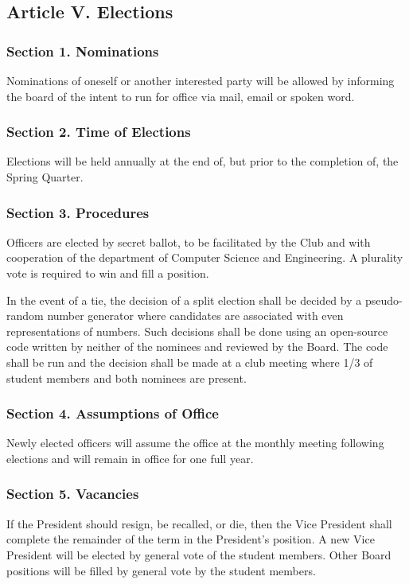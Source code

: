 \documentclass{article}
\begin{document}
  \subsection{Article V. Elections}

    \subsubsection{Section 1. Nominations}
      Nominations of oneself or another interested party will be allowed by informing the board of the intent to run for office via mail, email or spoken word.

    \subsubsection{Section 2. Time of Elections}
      Elections will be held annually at the end of, but prior to the completion of, the Spring Quarter.

    \subsubsection{Section 3. Procedures}
      Officers are elected by secret ballot, to be facilitated by the Club and with cooperation of the department of Computer Science and Engineering. A plurality vote is required to win and fill a position.

      In the event of a tie, the decision of a split election shall be decided by a pseudo-random number generator where candidates are associated with even representations of numbers.  Such decisions shall be done using an open-source code written by neither of the nominees and reviewed by the Board.  The code shall be run and the decision shall be made at a club meeting where 1/3 of student members and both nominees are present.

    \subsubsection{Section 4. Assumptions of Office}
      Newly elected officers will assume the office at the monthly meeting following elections and will remain in office for one full year.

    \subsubsection{Section 5. Vacancies}
      If the President should resign, be recalled, or die, then the Vice President shall complete the remainder of the term in the President’s position. A new Vice President will be elected by general vote of the student members.  Other Board positions will be filled by general vote by the student members.
\end{document}
